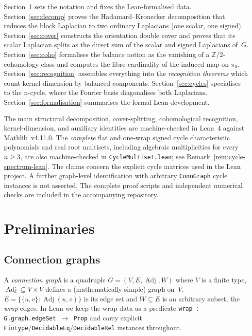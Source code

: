 \documentclass[11pt,a4paper]{amsart}
\theoremstyle{plain}
\theoremstyle{definition}
\theoremstyle{remark}
\DeclareMathOperator{\Adj}{Adj}
\newcommand{\ZZ}{\mathbb{Z}}
\begin{document}
Section~\ref{sec:prelim} sets the notation and fixes the
Lean-formalised data. Section~\ref{sec:decomp} proves the
Hadamard--Kronecker decomposition that reduces the block
Laplacian to two ordinary Laplacians (one scalar, one signed).
Section~\ref{sec:cover} constructs the orientation double cover
and proves that its scalar Laplacian splits as the direct sum of
the scalar and signed Laplacians of~$G$. Section~\ref{sec:coho}
formalises the balance notion as the vanishing of a
$\ZZ/2$-cohomology class and
computes the fibre cardinality of the induced map on
$\pi_0$. Section~\ref{sec:recognition} assembles everything into
the \emph{recognition theorems} which count kernel dimension by
balanced components. Section~\ref{sec:cycles} specialises to the
$n$-cycle, where the Fourier basis diagonalises both
Laplacians. Section~\ref{sec:formalisation} summarises the
formal Lean development.

The main structural decomposition, cover-splitting, cohomological
recognition, kernel-dimension, and auxiliary identities are
machine-checked in Lean~4 against Mathlib~v4.11.0. The \emph{complete}
flat and one-wrap signed cycle characteristic polynomials and real
root multisets, including algebraic multiplicities for every $n\ge3$,
are also machine-checked in \texttt{CycleMultiset.lean}; see
Remark~\ref{rem:cycle-spectrum-lean}. The claims concern the explicit
cycle matrices used in the Lean project. A further graph-level
identification with arbitrary \texttt{ConnGraph} cycle instances
is not asserted. The complete proof scripts and independent numerical
checks are included in the accompanying repository.

\section{Preliminaries}\label{sec:prelim}

\subsection{Connection graphs}

A \emph{connection graph} is a quadruple $G=(V,E,\Adj,W)$ where
$V$ is a finite type, $\Adj\subseteq V\times V$ defines a
(mathematically simple) graph on~$V$, $E=\{\{u,v\}:\Adj(u,v)\}$
is its edge set and $W\subseteq E$ is an arbitrary subset, the
\emph{wrap} edges. In Lean we keep the wrap data as a predicate
\texttt{wrap : G.graph.edgeSet $\to$ Prop} and carry explicit
\texttt{Fintype}/\texttt{DecidableEq}/\texttt{DecidableRel}
instances throughout.
\end{document}
